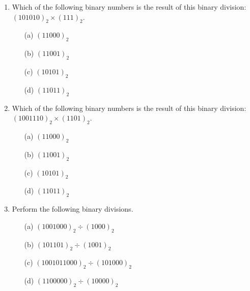 \documentclass[]{report}
\begin{document}
\begin{enumerate}
		\item Which of the following binary numbers is the result of this binary division: $(101010)_{2} \times( 111 )_{2}$. %
		\begin{multicols}{2}
			\begin{itemize}
				\item[(a)] $(11000)_{2}$ %
				\item[(b)] $(11001)_{2}$ %
				\item[(c)] $(10101)_{2}$ %
				\item[(d)] $(11011)_2$ %
			\end{itemize}
		\end{multicols}
		
		\item Which of the following binary numbers is the result of this binary division: $(1001110)_{2}\times ( 1101 )_{2}$. %
		\begin{multicols}{2}
			\begin{itemize}
				\item[(a)] $(11000)_{2}$ %
				\item[(b)] $(11001)_{2}$ %
				\item[(c)] $(10101)_{2}$ %
				\item[(d)] $(11011)_2$ %
			\end{itemize}
		\end{multicols}

	\item Perform the following binary divisions.
	\begin{multicols}{2}
	\begin{itemize}
	\item[(a)] $(1001000)_{2} \div ( 1000)_{2}$
	\item[(b)] $(101101)_{2} \div (1001)_{2}$
	\item[(c)] $(1001011000)_{2} \div (101000)_{2}$
	\item[(d)] $(1100000)_{2} \div (10000)_{2}$
	\end{itemize}
	\end{multicols}



\end{enumerate}


 
\end{document}
